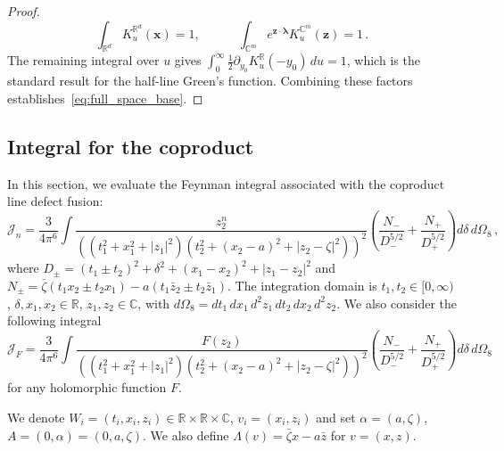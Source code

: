 \documentclass[11pt]{article}
\newcommand{\C}{\mathbb{C}}
\newcommand{\R}{\mathbb{R}}
\numberwithin{equation}{section}
\begin{document}
\begin{proof}
\begin{equation}
	\int_{\R^d} K^{\R^d}_u(\boldsymbol{x}) = 1,\quad\quad\quad \int_{\C^m} e^{\boldsymbol{z}\cdot\boldsymbol{\lambda}} K^{\C^m}_u(\boldsymbol{z}) = 1\,.
\end{equation}
The remaining integral over $u$ gives $\int_0^{\infty} \frac{1}{2}\partial_{y_0}K^{\R}_u(-y_0)\,du = 1$, which is the standard result for the half-line Green's function. Combining these factors establishes~\eqref{eq:full_space_base}.
\end{proof}

\subsection{Integral for the coproduct}
\label{sec:coproduct_integral}
In this section, we evaluate the Feynman integral associated with the coproduct line defect fusion:
\begin{equation}\label{eq:coprod_Jn}
	\mathcal{J}_n = \frac{3}{4\pi^6}\int \frac{z_2^n}{((t_1^2 + x_1^2 + |z_1|^2)(t_2^2 + (x_2 - a)^2 + |z_2 - \zeta|^2) )^2}\left(\frac{N_-}{D_-^{5/2}} + \frac{N_+}{D_+^{5/2}}\right)d\delta\, d\Omega_{8} \,,
\end{equation}
where $D_\pm = (t_1\pm t_2)^2 + \delta^2 + (x_1 - x_2)^2 + |z_1-z_2|^2$ and $N_{\pm}= \bar\zeta (t_1x_2 \pm t_2x_1) - a (t_1\bar z_2 \pm t_2\bar z_1)$. The integration domain is $t_1,t_2 \in [0,\infty)$, $\delta, x_1, x_2 \in \R$, $z_1,z_2 \in \C$, with $d\Omega_8 = dt_1\, dx_1\, d^2z_1\, dt_2\, dx_2\, d^2z_2$. We also consider the following integral
\begin{equation}
		\mathcal{J}_F = \frac{3}{4\pi^6}\int \frac{F(z_2)}{((t_1^2 + x_1^2 + |z_1|^2)(t_2^2 + (x_2 - a)^2 + |z_2 - \zeta|^2) )^2}\left(\frac{N_-}{D_-^{5/2}} + \frac{N_+}{D_+^{5/2}}\right)d\delta\, d\Omega_{8}  
\end{equation}
for any holomorphic function $F$.

We denote $ W_i=(t_i,x_i,z_i)\in \mathbb R\times \mathbb R\times \mathbb C$, $v_i=(x_i,z_i)$ and set $ \alpha =(a,\zeta)$, $A=(0,\alpha)=(0,a,\zeta)$. We also define $\Lambda(v)=\bar\zeta x-a\bar z$ for $v=(x,z)$.
\end{document}
